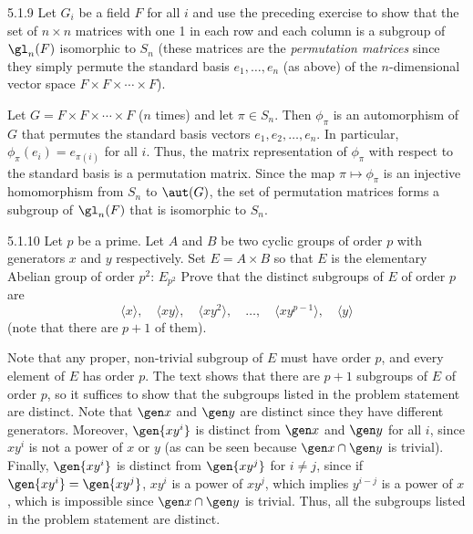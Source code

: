 \begin{exercise}{5.1.9}
    Let $G_i$ be a field $F$ for all $i$ and use the preceding exercise to show that the set of $n \times n$ matrices with one 1 in each row and each column is a subgroup of $\gl_n(F)$ isomorphic to $S_n$ (these matrices are the \emph{permutation matrices} since they simply permute the standard basis $e_1, \ldots, e_n$ (as above) of the $n$-dimensional vector space $F \times F \times \cdots \times F$).
\end{exercise}

\begin{sol}
    Let $G = F \times F \times \cdots \times F$ ($n$ times) and let $\pi \in S_n$.
	Then $\phi_\pi$ is an automorphism of $G$ that permutes the standard basis vectors $e_1, e_2, \ldots, e_n$.
	In particular, $\phi_\pi(e_i) = e_{\pi(i)}$ for all $i$.
	Thus, the matrix representation of $\phi_\pi$ with respect to the standard basis is a permutation matrix.
	Since the map $\pi \mapsto \phi_\pi$ is an injective homomorphism from $S_n$ to $\aut(G)$, the set of permutation matrices forms a subgroup of $\gl_n(F)$ that is isomorphic to $S_n$.
\end{sol}

\begin{exercise}{5.1.10}
    Let $p$ be a prime.
	Let $A$ and $B$ be two cyclic groups of order $p$ with generators $x$ and $y$ respectively.
	Set $E = A \times B$ so that $E$ is the elementary Abelian group of order $p^2$: $E_{p^2}$ Prove that the distinct subgroups of $E$ of order $p$ are
    \[
    	\langle x \rangle, \quad \langle xy \rangle, \quad \langle xy^2 \rangle, \quad \ldots, \quad \langle xy^{p-1} \rangle, \quad \langle y \rangle
    \]
	(note that there are $p + 1$ of them).
\end{exercise}

\begin{sol}
    Note that any proper, non-trivial subgroup of $E$ must have order $p$, and every element of $E$ has order $p$.
	The text shows that there are $p + 1$ subgroups of $E$ of order $p$, so it suffices to show that the subgroups listed in the problem statement are distinct.
	Note that $\gen x$ and $\gen y$ are distinct since they have different generators.
	Moreover, $\gen{xy^i}$ is distinct from $\gen x$ and $\gen y$ for all $i$, since $xy^i$ is not a power of $x$ or $y$ (as can be seen because $\gen x \cap \gen y$ is trivial).
	Finally, $\gen{xy^i}$ is distinct from $\gen{xy^j}$ for $i \neq j$, since if $\gen{xy^i} = \gen{xy^j}$, $xy^i$ is a power of $xy^j$, which implies $y^{i-j}$ is a power of $x$, which is impossible since $\gen x \cap \gen y$ is trivial.
	Thus, all the subgroups listed in the problem statement are distinct.
\end{sol}

